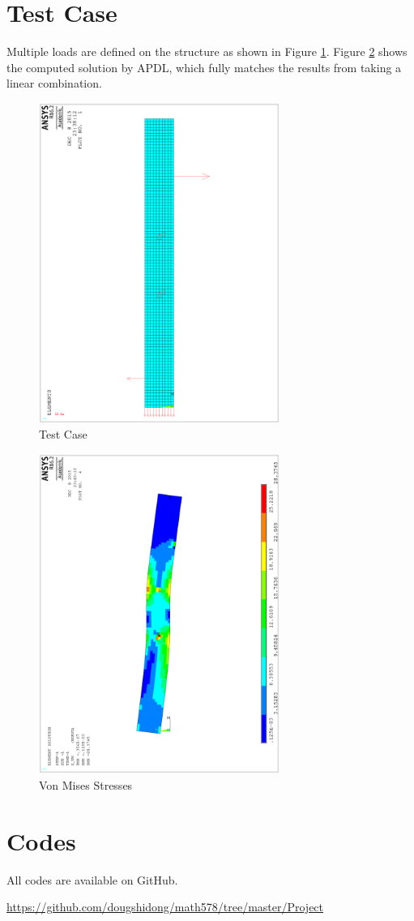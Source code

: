 \documentclass[letterpaper,12pt,]{article}
\begin{document}
\section*{Test Case}

Multiple loads are defined on the structure as shown in Figure \ref{fig:case1}. Figure \ref{fig:res1} shows the computed solution by APDL, which fully matches the results from taking a linear combination.

\begin{figure}[h]
\centering
\includegraphics[width=0.7\textwidth,angle=-90]{tcase000.eps}
\caption{Test Case}
\label{fig:case1}
\end{figure}

\begin{figure}[h]
\centering
\includegraphics[width=0.7\textwidth,angle=-90]{tcasesol.eps}
\caption{Von Mises Stresses}
\label{fig:res1}
\end{figure}

\section*{Codes}

All codes are available on GitHub.

\url{https://github.com/dougshidong/math578/tree/master/Project}
\end{document}
